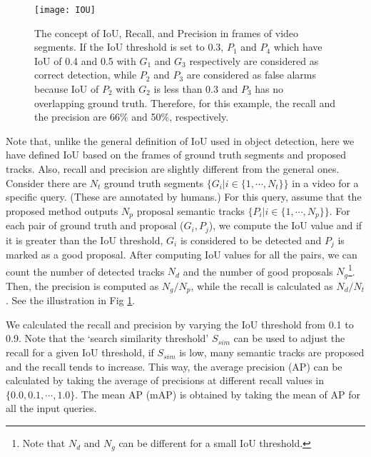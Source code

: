 %
\begin{figure}[tbp]
\texttt{[image: IOU]}
\caption{The concept of IoU, Recall, and Precision in frames of video segments. If the IoU threshold is set to 0.3, $P_1$ and $P_4$ which have IoU of 0.4 and 0.5 with $G_1$ and $G_3$ respectively are considered as correct detection, while $P_2$ and $P_3$ are considered as false alarms because IoU of $P_2$ with $G_2$ is less than 0.3 and $P_3$ has no overlapping ground truth. Therefore, for this example, the recall and the precision are 66\% and 50\%, respectively.}
\label{fig:IOU}
\end{figure}
%

Note that, unlike the general definition of IoU used in object detection, here we have defined IoU based on the frames of ground truth segments and proposed tracks. Also, recall and precision are slightly different from the general ones. 
%
Consider there are $N_t$ ground truth segments $\{G_i | i \in \{1, \cdots, N_t\} \}$ in a video for a specific query. (These are annotated by humans.) For this query, assume that the proposed method outputs $N_p$ proposal semantic tracks $\{P_i | i \in \{1, \cdots, N_p\} \}$. For each pair of ground truth and proposal ($G_i, P_j$), we compute the IoU value and if it is greater than the IoU threshold, $G_i$ is considered to be detected and $P_j$ is marked as a good proposal. After computing IoU values for all the pairs, we can count the number of detected tracks $N_d$ and the number of good proposals $N_g$\footnote{Note that $N_d$ and $N_g$ can be different for a small IoU threshold.}.  Then, the precision is computed as $N_g/N_p$, while the recall is calculated as $N_d/N_t$. See the illustration in Fig \textcolor{red}{\ref{fig:IOU}}.

We calculated the recall and precision by varying the IoU threshold from 0.1 to 0.9. 
Note that the `search similarity threshold' $S_{sim}$ can be used to adjust the recall for a given IoU threshold, \ie if $S_{sim}$ is low, many semantic tracks are proposed and the recall tends to increase. 
This way, the average precision (AP) can be calculated by taking the average of precisions at different recall values in $\{0.0, 0.1, \cdots, 1.0\}$.  
The mean AP (mAP) is obtained by taking the mean of AP for all the input queries.




